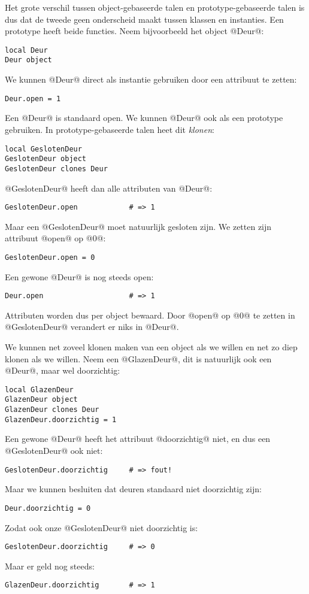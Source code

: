 Het grote verschil tussen object-gebaseerde talen en prototype-gebaseerde talen is dus dat de tweede geen onderscheid maakt tussen klassen en instanties. Een prototype heeft beide functies. Neem bijvoorbeeld het object @Deur@:
\begin{lstlisting}[name=deuren]
local Deur
Deur object
\end{lstlisting}
We kunnen @Deur@ direct als instantie gebruiken door een attribuut te zetten:
\begin{lstlisting}[name=deuren]
Deur.open = 1
\end{lstlisting}
Een @Deur@ is standaard open. We kunnen @Deur@ ook als een prototype gebruiken. In prototype-gebaseerde talen heet dit \emph{klonen}:
\begin{lstlisting}[name=deuren]
local GeslotenDeur
GeslotenDeur object
GeslotenDeur clones Deur
\end{lstlisting}
@GeslotenDeur@ heeft dan alle attributen van @Deur@:
\begin{lstlisting}[name=deuren]
GeslotenDeur.open            # => 1
\end{lstlisting}
Maar een @GeslotenDeur@ moet natuurlijk gesloten zijn. We zetten zijn attribuut @open@ op @0@:
\begin{lstlisting}[name=deuren]
GeslotenDeur.open = 0
\end{lstlisting}
Een gewone @Deur@ is nog steeds open:
\begin{lstlisting}[name=deuren]
Deur.open                    # => 1
\end{lstlisting}
Attributen worden dus per object bewaard. Door @open@ op @0@ te zetten in @GeslotenDeur@ verandert er niks in @Deur@.

We kunnen net zoveel klonen maken van een object als we willen en net zo diep klonen als we willen. Neem een @GlazenDeur@, dit is natuurlijk ook een @Deur@, maar wel doorzichtig:
\begin{lstlisting}[name=deuren]
local GlazenDeur
GlazenDeur object
GlazenDeur clones Deur
GlazenDeur.doorzichtig = 1
\end{lstlisting}
Een gewone @Deur@ heeft het attribuut @doorzichtig@ niet, en dus een @GeslotenDeur@ ook niet:
\begin{lstlisting}[name=deuren]
GeslotenDeur.doorzichtig     # => fout!
\end{lstlisting}
Maar we kunnen besluiten dat deuren standaard niet doorzichtig zijn:
\begin{lstlisting}[name=deuren]
Deur.doorzichtig = 0
\end{lstlisting}
Zodat ook onze @GeslotenDeur@ niet doorzichtig is:
\begin{lstlisting}[name=deuren]
GeslotenDeur.doorzichtig     # => 0
\end{lstlisting}
Maar er geld nog steeds:
\begin{lstlisting}[name=deuren]
GlazenDeur.doorzichtig       # => 1
\end{lstlisting}

